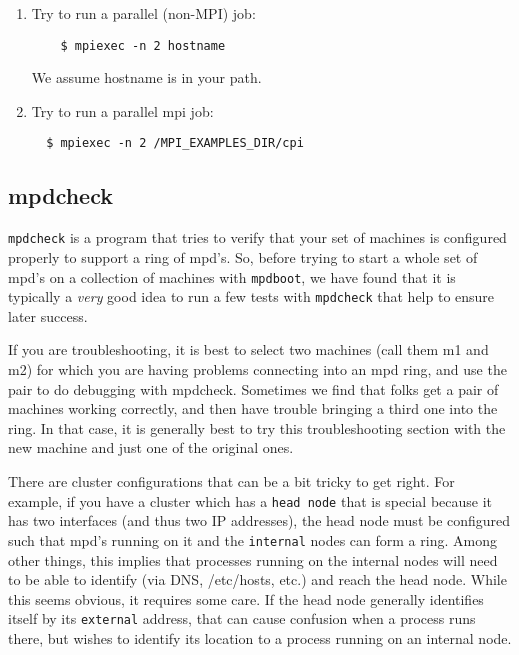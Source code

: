 \documentclass[dvipdfm,11pt]{article}
\begin{document}
\begin{enumerate}
\item Try to run a parallel (non-MPI) job:
\begin{verbatim}
    $ mpiexec -n 2 hostname    
\end{verbatim}
We assume \texttt{}hostname is in your path.

\item Try to run a parallel mpi job:
\begin{verbatim}
  $ mpiexec -n 2 /MPI_EXAMPLES_DIR/cpi    
\end{verbatim}

\end{enumerate}


\subsection{mpdcheck}
\label{sec:mpdcheck}

\texttt{mpdcheck} is a program that tries to verify that your set
of machines is configured properly to support a ring of mpd's.  So,
before trying to start a whole set of mpd's on a collection of machines
with \texttt{mpdboot}, we have found that it is typically a \emph{very}
good idea to run a few tests with \texttt{mpdcheck} that help to ensure
later success.

If you are troubleshooting, it is best to select two machines (call them
m1 and m2) for which you are having problems connecting into an mpd ring,
and use the pair to do debugging with mpdcheck.  Sometimes we find that
folks get a pair of machines working correctly, and then have trouble
bringing a third one into the ring.  In that case, it is generally best
to try this troubleshooting section with the new machine and just one
of the original ones.

There are cluster configurations that can be a bit tricky to get right.
For example, if you have a cluster which has a \texttt{head node} that
is special because it has two interfaces (and thus two IP addresses),
the head node must be configured such that mpd's running on it and
the \texttt{internal} nodes can form a ring.  Among other things, this
implies that processes running on the internal nodes will need to be
able to identify (via DNS, /etc/hosts, etc.) and reach the head node.
While this seems obvious, it requires some care.  If the head node
generally identifies itself by its \texttt{external} address, that can
cause confusion when a process runs there, but wishes to identify its
location to a process running on an internal node.
\end{document}

